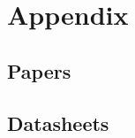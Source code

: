 \appendix
	
\section{Appendix} 
	\subsection{Papers}
	
	
	
	\subsection{Datasheets} \label{sec:appendix}
	

